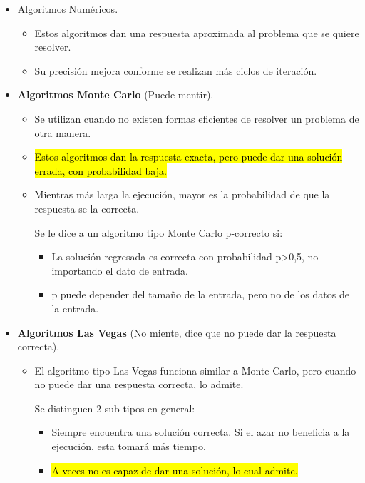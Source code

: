 \documentclass{templateNote}
\begin{document}
\begin{itemize}
    \item Algoritmos Numéricos.
    \begin{itemize}
        \item Estos algoritmos dan una respuesta aproximada al problema que se quiere resolver.

        \item Su precisión mejora conforme se realizan más ciclos de iteración.
    \end{itemize}

    \item \textbf{Algoritmos Monte Carlo} (Puede mentir).
    \begin{itemize}
        \item Se utilizan cuando no existen formas eficientes de resolver un problema de otra manera.

        \item \hl{Estos algoritmos dan la respuesta exacta, pero puede dar una solución errada, con probabilidad baja.}

        \item Mientras más larga la ejecución, mayor es la probabilidad de que la respuesta se la correcta.
        
        Se le dice a un algoritmo tipo Monte Carlo p-correcto si:
        \begin{itemize}
            \item La solución regresada es correcta con probabilidad p>0,5, no importando el dato de entrada.
            \item p puede depender del tamaño de la entrada, pero no de los datos de la entrada.
        \end{itemize}

    \end{itemize}
    
    \item \textbf{Algoritmos Las Vegas} (No miente, dice que no puede dar la respuesta correcta).
    \begin{itemize}
        \item El algoritmo tipo Las Vegas funciona similar a Monte Carlo, pero cuando no puede dar una respuesta correcta, lo admite.
        
        Se distinguen 2 sub-tipos en general:
        \begin{itemize}
            \item Siempre encuentra una solución correcta. Si el azar no beneficia a la ejecución, esta tomará más tiempo.
            \item \hl{A veces no es capaz de dar una solución, lo cual admite.}
        \end{itemize}
    \end{itemize}
\end{itemize}
\end{document}
